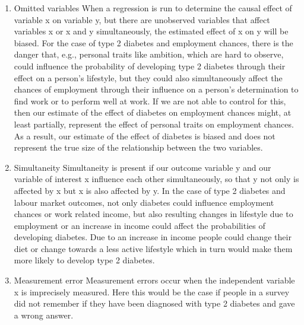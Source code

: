 \begin{enumerate}

\item 	Omitted variables
When a regression is run to determine the causal effect of variable x on variable y, but there are unobserved variables that affect variables x or x and y simultaneously, the estimated effect of x on y will be biased. For the case of type 2 diabetes and employment chances, there is the danger that, e.g., personal traits like ambition, which are hard to observe, could influence the probability of developing type 2 diabetes through their effect on a person's lifestyle, but they could also simultaneously affect the chances of employment through their influence on a person's determination to find work or to perform well at work. If we are not able to control for this, then our estimate of the effect of diabetes on employment chances might, at least partially, represent the effect of personal traits on employment chances. As a result, our estimate of the effect of diabetes is biased and does not represent the true size of the relationship between the two variables.
\item 	Simultaneity
Simultaneity is present if our outcome variable y and our variable of interest x influence each other simultaneously, so that y not only is affected by x but x is also affected by y. In the case of type 2 diabetes and labour market outcomes, not only diabetes could influence employment chances or work related income, but also resulting changes in lifestyle due to employment or an increase in income could affect the probabilities of developing diabetes. Due to an increase in income people could change their diet or change towards a less active lifestyle which in turn would make them more likely to develop type 2 diabetes.
\item 	Measurement error
Measurement errors occur when the independent variable x is imprecisely measured. Here this would be the case if people in a survey did not remember if they have been diagnosed with type 2 diabetes and gave a wrong answer.
\end{enumerate}

